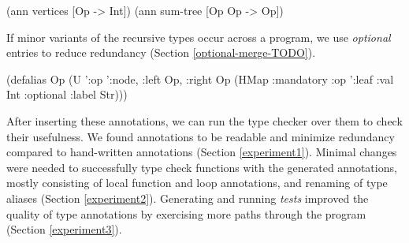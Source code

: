 \begin{cljlisting}
(ann vertices [Op -> Int])
(ann sum-tree [Op Op -> Op])
\end{cljlisting}
 
If minor variants of the recursive types occur
across a program,
we use \textit{optional} entries%
to reduce redundancy (Section \ref{optional-merge-TODO}).
 
\begin{cljlisting}
(defalias Op 
  (U '{:op ':node, :left Op, :right Op}
     (HMap :mandatory {:op ':leaf :val Int}
           :optional {:label Str})))
\end{cljlisting}

After inserting these annotations, we can run the
type checker over them to check their usefulness.
We found annotations to be readable and minimize
redundancy compared to hand-written annotations
(Section \ref{experiment1}).
Minimal changes were needed to successfully type check
functions with the generated annotations,
mostly consisting of local function and loop annotations,
and renaming of type aliases
(Section \ref{experiment2}).
Generating and running \textit{tests} improved the quality
of type annotations by exercising more paths through the
program (Section \ref{experiment3}).


%
%
%

